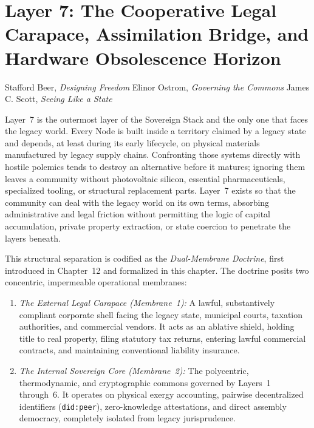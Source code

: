 \chapter[Layer 7: The Carapace and Assimilation Bridge]{Layer 7: The Cooperative Legal Carapace, Assimilation Bridge, and Hardware Obsolescence Horizon}

\begin{epigraphs}
  {Stafford Beer, \textit{Designing Freedom} \parencite{beer1974}}
  {Elinor Ostrom, \textit{Governing the Commons} \parencite{ostrom1990}}
  {James C. Scott, \textit{Seeing Like a State} \parencite{scott1998}}
\end{epigraphs}

Layer~7 is the outermost layer of the Sovereign Stack and the only one that faces the legacy world. Every Node is built inside a territory claimed by a legacy state and depends, at least during its early lifecycle, on physical materials manufactured by legacy supply chains. Confronting those systems directly with hostile polemics tends to destroy an alternative before it matures; ignoring them leaves a community without photovoltaic silicon, essential pharmaceuticals, specialized tooling, or structural replacement parts. Layer~7 exists so that the community can deal with the legacy world on its own terms, absorbing administrative and legal friction without permitting the logic of capital accumulation, private property extraction, or state coercion to penetrate the layers beneath.

This structural separation is codified as the \textit{Dual-Membrane Doctrine}, first introduced in Chapter~12 and formalized in this chapter. The doctrine posits two concentric, impermeable operational membranes:
\begin{enumerate}
  \item \textit{The External Legal Carapace (Membrane~1):} A lawful, substantively compliant corporate shell facing the legacy state, municipal courts, taxation authorities, and commercial vendors. It acts as an ablative shield, holding title to real property, filing statutory tax returns, entering lawful commercial contracts, and maintaining conventional liability insurance.
  \item \textit{The Internal Sovereign Core (Membrane~2):} The polycentric, thermodynamic, and cryptographic commons governed by Layers~1 through~6. It operates on physical exergy accounting, pairwise decentralized identifiers (\texttt{did:peer}), zero-knowledge attestations, and direct assembly democracy, completely isolated from legacy jurisprudence.
\end{enumerate}

